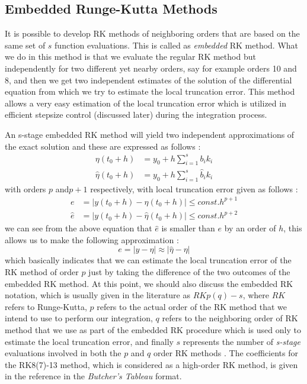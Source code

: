 \subsection{Embedded Runge-Kutta Methods}
It is possible to develop \gls{RK} methods of neighboring orders that are based on the same set of $s$ function evaluations. This is called as \textit{embedded} \gls{RK} method. What we do in this method is that we evaluate the regular \gls{RK} method but independently for two different yet nearby orders, say for example orders 10 and 8, and then we get two independent estimates of the solution of the differential equation from which we try to estimate the local truncation error. This method allows a very easy estimation of the local truncation error which is utilized in efficient stepsize control (discussed later) during the integration process.

An s-stage embedded \gls{RK} method will yield two independent approximations of the exact solution and these are expressed as follows \cite{gillbook}:
\begin{align}
\eta(t_0+h) &= y_0 + h\sum_{i=1}^{s} b_ik_i\\
\hat{\eta}(t_0+h) &= y_0 + h\sum_{i=1}^{s} \hat{b}_ik_i
\end{align}
%
with orders $p$ and$p+1$ respectively, with local truncation error given as follows \cite{gillbook}:
\begin{align}
e &= |y(t_0 + h) - \eta(t_0 + h)| \leq const.h^{p+1} \\
\hat{e} &= |y(t_0 + h) - \hat{\eta}(t_0 + h)| \leq const.h^{p+2}
\end{align}
%
we can see from the above equation that $\hat{e}$ is smaller than $e$ by an order of $h$, this allows us to make the following approximation \cite{gillbook}:
\begin{equation}
e = |y - \eta| \approx |\hat{\eta} - \eta|
\end{equation}
%
which basically indicates that we can estimate the local truncation error of the \gls{RK} method of order $p$ just by taking the difference of the two outcomes of the embedded \gls{RK} method. At this point, we should also discuss the embedded \gls{RK} notation, which is usually given in the literature as $RKp(q)-s$, where $RK$ refers to Runge-Kutta, $p$ refers to the actual order of the \gls{RK} method that we intend to use to perform our integration, $q$ refers to the neighboring order of \gls{RK} method that we use as part of the embedded \gls{RK} procedure which is used only to estimate the local truncation error, and finally $s$ represents the number of \textit{s-stage} evaluations involved in both the $p$ and $q$ order \gls{RK} methods \cite{gillbook}. The coefficients for the RK8(7)-13 method, which is considered as a high-order \gls{RK} method, is given in the reference \cite{gillbook} in the \textit{Butcher's Tableau} format.

